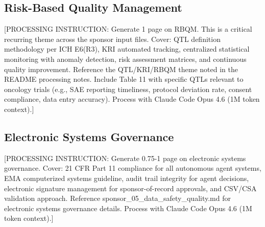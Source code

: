 \subsection{Risk-Based Quality Management}

[PROCESSING INSTRUCTION: Generate 1 page on RBQM. This is a critical recurring theme across
the sponsor input files. Cover: QTL definition methodology per ICH E6(R3), KRI automated
tracking, centralized statistical monitoring with anomaly detection, risk assessment
matrices, and continuous quality improvement. Reference the QTL/KRI/RBQM theme noted
in the README processing notes. Include Table 11 with specific QTLs relevant to
oncology trials (e.g., SAE reporting timeliness, protocol deviation rate, consent
compliance, data entry accuracy). Process with Claude Code Opus 4.6 (1M token context).]

\subsection{Electronic Systems Governance}

[PROCESSING INSTRUCTION: Generate 0.75-1 page on electronic systems governance. Cover:
21 CFR Part 11 compliance for all autonomous agent systems, EMA computerized systems
guideline, audit trail integrity for agent decisions, electronic signature management
for sponsor-of-record approvals, and CSV/CSA validation approach. Reference
sponsor\_05\_data\_safety\_quality.md for electronic systems governance details.
Process with Claude Code Opus 4.6 (1M token context).]
